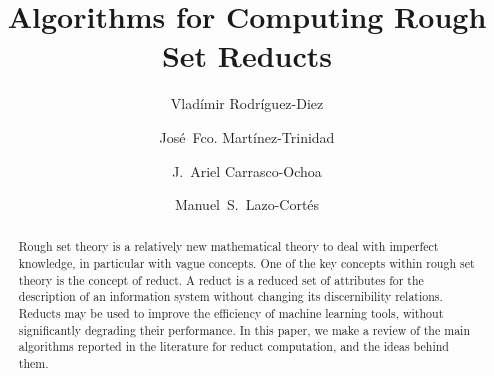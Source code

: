 \documentclass[citenumber]{llncs}
\begin{document}
\mainmatter              %
%
\title{Algorithms for Computing Rough Set Reducts}
%

\author{Vlad\'{i}mir Rodr\'{i}guez-Diez \and Jos\'{e}~Fco. Mart\'{i}nez-Trinidad
		 \and J.~Ariel Carrasco-Ochoa \and Manuel~S.~Lazo-Cortés}
%
%



\maketitle              %

%
\begin{abstract}
%
	Rough set theory is a relatively new mathematical theory to deal with imperfect knowledge, in particular with vague concepts. One of the key concepts within rough set theory is the concept of reduct. A reduct is a reduced set of attributes for the description of an information system without changing its discernibility relations. Reducts may be used to improve the efficiency of machine learning tools, without significantly degrading their performance. In this paper, we make a review of the main algorithms reported in the literature for reduct computation, and the ideas behind them.
%
\end{abstract}
%

%
\end{document}
